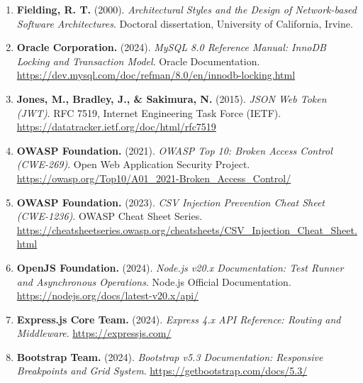 \documentclass[11pt,a4paper]{article}
\begin{document}
\begin{enumerate}[leftmargin=*]
    \item \textbf{Fielding, R. T.} (2000). \textit{Architectural Styles and the Design of Network-based Software Architectures}. Doctoral dissertation, University of California, Irvine.
    \item \textbf{Oracle Corporation.} (2024). \textit{MySQL 8.0 Reference Manual: InnoDB Locking and Transaction Model}. Oracle Documentation. \url{https://dev.mysql.com/doc/refman/8.0/en/innodb-locking.html}
    \item \textbf{Jones, M., Bradley, J., \& Sakimura, N.} (2015). \textit{JSON Web Token (JWT)}. RFC 7519, Internet Engineering Task Force (IETF). \url{https://datatracker.ietf.org/doc/html/rfc7519}
    \item \textbf{OWASP Foundation.} (2021). \textit{OWASP Top 10: Broken Access Control (CWE-269)}. Open Web Application Security Project. \url{https://owasp.org/Top10/A01_2021-Broken_Access_Control/}
    \item \textbf{OWASP Foundation.} (2023). \textit{CSV Injection Prevention Cheat Sheet (CWE-1236)}. OWASP Cheat Sheet Series. \url{https://cheatsheetseries.owasp.org/cheatsheets/CSV_Injection_Cheat_Sheet.html}
    \item \textbf{OpenJS Foundation.} (2024). \textit{Node.js v20.x Documentation: Test Runner and Asynchronous Operations}. Node.js Official Documentation. \url{https://nodejs.org/docs/latest-v20.x/api/}
    \item \textbf{Express.js Core Team.} (2024). \textit{Express 4.x API Reference: Routing and Middleware}. \url{https://expressjs.com/}
    \item \textbf{Bootstrap Team.} (2024). \textit{Bootstrap v5.3 Documentation: Responsive Breakpoints and Grid System}. \url{https://getbootstrap.com/docs/5.3/}
\end{enumerate}
\end{document}
